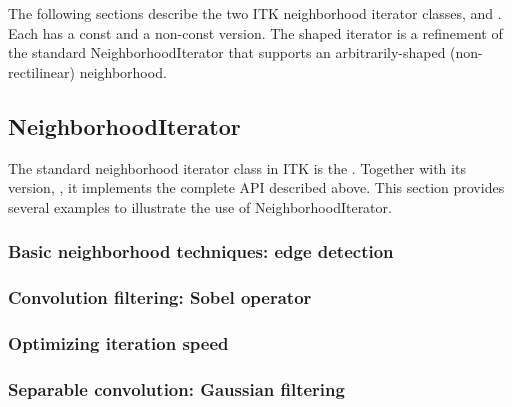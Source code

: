 {The following sections describe the two ITK neighborhood iterator classes,
 and .
Each has a const and a non-const version.  The shaped iterator is a refinement
of the standard NeighborhoodIterator that supports an
arbitrarily-shaped (non-rectilinear) neighborhood.

\subsection{NeighborhoodIterator}
\label{sec:itkNeighborhoodIterator}

The standard neighborhood iterator class in ITK is the
.  Together with its  version,
, it implements the complete API
described above.  This section provides several examples to illustrate the use
of NeighborhoodIterator.

\subsubsection{Basic neighborhood techniques: edge detection}
\label{sec:NeighborhoodExample1}


\subsubsection{Convolution filtering: Sobel operator}
\label{sec:NeighborhoodExample2}


\subsubsection{Optimizing iteration speed}
\label{sec:NeighborhoodExample3}


\subsubsection{Separable convolution: Gaussian filtering}
\label{sec:NeighborhoodExample4}



}
